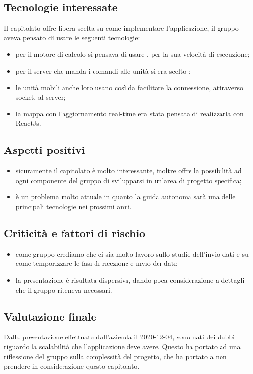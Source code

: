 \subsection{Tecnologie interessate}
Il capitolato offre libera scelta su come implementare l'applicazione, il gruppo aveva pensato di usare le seguenti tecnologie:
\begin{itemize}
\item per il motore di calcolo si pensava di usare , per la sua velocità di esecuzione;
\item per il server che manda i comandi alle unità si era scelto ;
\item le unità mobili anche loro usano  così da facilitare la connessione, attraverso socket, al server;
\item la mappa con l'aggiornamento real-time era stata pensata di realizzarla con ReactJs.
\end{itemize}

\subsection{Aspetti positivi}
\begin{itemize}
\item sicuramente il capitolato è molto interessante, inoltre offre la possibilità ad ogni componente del gruppo di svilupparsi in un'area di progetto specifica;
\item è un problema molto attuale in quanto la guida autonoma sarà una delle principali tecnologie nei prossimi anni.
\end{itemize}

\subsection{Criticità e fattori di rischio}
\begin{itemize}
\item come gruppo crediamo che ci sia molto lavoro sullo studio dell'invio dati e su come temporizzare le fasi di ricezione e invio dei dati;
\item la presentazione è risultata dispersiva, dando poca considerazione a dettagli che il gruppo riteneva necessari.  
\end{itemize}

\subsection{Valutazione finale}
Dalla presentazione effettuata dall'azienda il 2020-12-04, sono nati dei dubbi riguardo la scalabilità che l'applicazione deve avere. Questo ha portato ad una riflessione del gruppo sulla complessità del progetto, che ha portato a non prendere in considerazione questo capitolato.